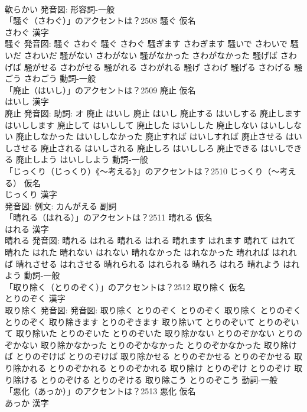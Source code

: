 \documentclass[8pt]{extreport}
\begin{document}
\begin{CJK}{UTF8}{min}
\\	軟らかい 発音図:							形容詞-一般 
\\	「騒ぐ（さわぐ）」のアクセントは？2508	騒ぐ 仮名　
\\	さわぐ 漢字　
\\	騒ぐ 発音図:	騒ぐ さわぐ		騒ぐ さわぐ 騒ぎます さわぎます 騒いで さわいで 騒いだ さわいだ 騒がない さわがない 騒がなかった さわがなかった 騒げば さわげば 騒がせる さわがせる 騒がれる さわがれる 騒げ さわげ 騒げる さわげる 騒ごう さわごう				動詞-一般 
\\	「廃止（はいし）」のアクセントは？2509	廃止 仮名　
\\	はいし 漢字　
\\	廃止 発音図: 助詞: オ	廃止 はいし		廃止 はいし 廃止する はいしする 廃止します はいしします 廃止して はいしして 廃止した はいしした 廃止しない はいししない 廃止しなかった はいししなかった 廃止すれば はいしすれば 廃止させる はいしさせる 廃止される はいしされる 廃止しろ はいししろ 廃止できる はいしできる 廃止しよう はいししよう				動詞-一般 
\\	「じっくり（じっくり）《〜考える》」のアクセントは？2510	じっくり（〜考える） 仮名　
\\	じっくり 漢字　
\\	発音図: 例文: カんがえる							副詞 
\\	「晴れる（はれる）」のアクセントは？2511	晴れる 仮名　
\\	はれる 漢字　
\\	晴れる 発音図:	晴れる はれる		晴れる はれる 晴れます はれます 晴れて はれて 晴れた はれた 晴れない はれない 晴れなかった はれなかった 晴れれば はれれば 晴れさせる はれさせる 晴れられる はれられる 晴れろ はれろ 晴れよう はれよう				動詞-一般 
\\	「取り除く（とりのぞく）」のアクセントは？2512	取り除く 仮名　
\\	とりのぞく 漢字　
\\	取り除く 発音図: 発音図:	取り除く とりのぞく とりのぞく		取り除く とりのぞく とりのぞく 取り除きます とりのぞきます 取り除いて とりのぞいて とりのぞいて 取り除いた とりのぞいた とりのぞいた 取り除かない とりのぞかない とりのぞかない 取り除かなかった とりのぞかなかった とりのぞかなかった 取り除けば とりのぞけば とりのぞけば 取り除かせる とりのぞかせる とりのぞかせる 取り除かれる とりのぞかれる とりのぞかれる 取り除け とりのぞけ とりのぞけ 取り除ける とりのぞける とりのぞける 取り除こう とりのぞこう				動詞-一般 
\\	「悪化（あっか）」のアクセントは？2513	悪化 仮名　
\\	あっか 漢字　

\end{CJK}
\end{document}
